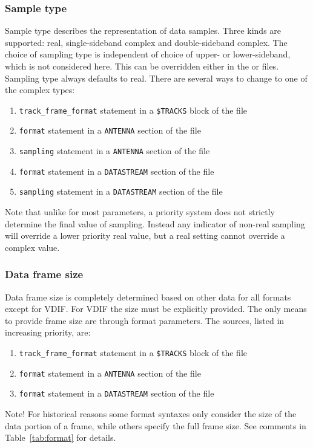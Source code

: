 \documentclass[12pt]{article}
\begin{document}
\subsubsection{Sample type}

Sample type describes the representation of data samples.
Three kinds are supported: real, single-sideband complex and double-sideband complex.
The choice of sampling type is independent of choice of upper- or lower-sideband, which is not considered here.
This can be overridden either in the \vx or \vd files.
Sampling type always defaults to real.
There are several ways to change to one of the complex types:
\begin{enumerate}
\item {\tt track\_frame\_format} statement in a {\tt \$TRACKS} block of the \vx file
\item {\tt format} statement in a {\tt ANTENNA} section of the \vd file
\item {\tt sampling} statement in a {\tt ANTENNA} section of the \vd file
\item {\tt format} statement in a {\tt DATASTREAM} section of the \vd file
\item {\tt sampling} statement in a {\tt DATASTREAM} section of the \vd file
\end{enumerate}
Note that unlike for most parameters, a priority system does not strictly determine the final value of sampling.
Instead any indicator of non-real sampling will override a lower priority real value, but a real setting cannot override a complex value.

\subsubsection{Data frame size}

Data frame size is completely determined based on other data for all formats except for VDIF.
For VDIF the size must be explicitly provided.
The only means to provide frame size are through format parameters.
The sources, listed in increasing priority, are:
\begin{enumerate}
\item {\tt track\_frame\_format} statement in a {\tt \$TRACKS} block of the \vx file
\item {\tt format} statement in a {\tt ANTENNA} section of the \vd file
\item {\tt format} statement in a {\tt DATASTREAM} section of the \vd file
\end{enumerate}
\noindent
Note! For historical reasons some format syntaxes only consider the size of the data portion of a frame, while others specify the full frame size.
See comments in Table~\ref{tab:format} for details.
\end{document}
